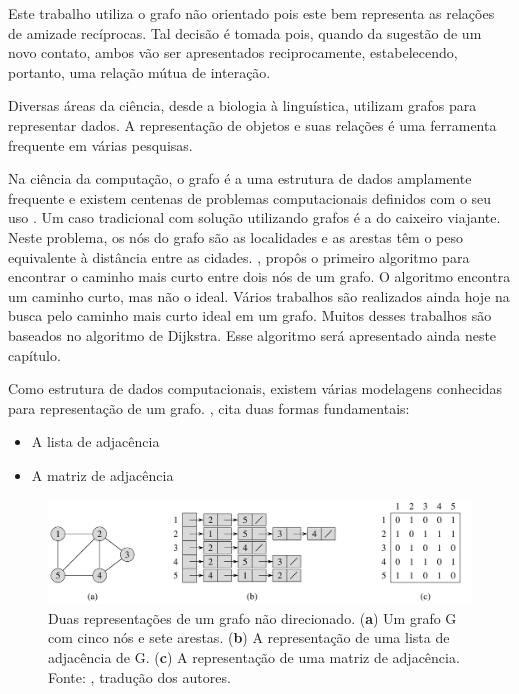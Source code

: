 Este trabalho utiliza o grafo não orientado pois este bem representa as relações de amizade recíprocas. Tal decisão é tomada pois, quando da sugestão de um novo contato, ambos vão ser apresentados reciprocamente, estabelecendo, portanto, uma relação mútua de interação.

Diversas áreas da ciência, desde a biologia à linguística, utilizam grafos para representar dados. A representação de objetos e suas relações é uma ferramenta frequente em várias pesquisas.

Na ciência da computação, o grafo é a uma estrutura de dados amplamente frequente e existem centenas de problemas computacionais definidos com o seu uso \cite{Cormen2009}. Um caso tradicional com solução utilizando grafos é a do caixeiro viajante. Neste problema, os nós do grafo são as localidades e as arestas têm o peso equivalente à distância entre as cidades. \citep{Dijkstra1959}, propôs o primeiro algoritmo para encontrar o caminho mais curto entre dois nós de um grafo. O algoritmo encontra um caminho curto, mas não o ideal. Vários trabalhos são realizados ainda hoje na busca pelo caminho mais curto ideal em um grafo. Muitos desses trabalhos são baseados no algoritmo de Dijkstra. Esse algoritmo será apresentado ainda neste capítulo.

Como estrutura de dados computacionais, existem várias modelagens conhecidas para representação de um grafo. \citep{Cormen2009}, cita duas formas fundamentais:

\begin{itemize}
\item A lista de adjacência
\item A matriz de adjacência
\end{itemize}

\begin{figure}[!htb]
\centering
\includegraphics[width=16cm]{represent_grafo.png}
\caption{Duas representações de um grafo não direcionado. (\textbf{a}) Um grafo G com cinco nós e sete arestas. (\textbf{b}) A representação de uma lista de adjacência de G. (\textbf{c}) A representação de uma matriz de adjacência. Fonte: \cite{Cormen2009}, tradução dos autores.}
\label{fig:represent_grafo}
\end{figure}


